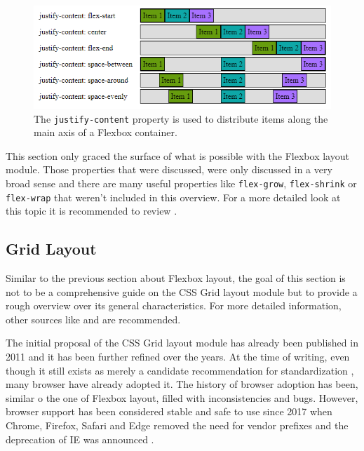\begin{figure}[tp]
    \centering
    \includegraphics[keepaspectratio,width=\linewidth,height=\fullh / 3]
    {images/flexbox-justify-content.png}

    \caption[Flexbox Justify Content Property]{
        The \lstinline{justify-content} property is used to distribute items along the main axis of a Flexbox container.
    }
    \label{fig:FlexboxJustifyContent}
\end{figure}

This section only graced the surface of what is possible with the Flexbox layout module. Those properties that were discussed, were only discussed in a very broad sense and there are many useful properties like \lstinline{flex-grow}, \lstinline{flex-shrink} or \lstinline{flex-wrap} that weren't included in this overview. For a more detailed look at this topic it is recommended to review \cite{CSSFlexbox}.

\subsection{Grid Layout}

Similar to the previous section about Flexbox layout, the goal of this section is not to be a comprehensive guide on the CSS Grid layout module but to provide a rough overview over its general characteristics. For more detailed information, other sources like \cite{GridLayoutInCSS} and \cite{CSSGrid} are recommended.

The initial proposal of the CSS Grid layout module has already been published in 2011 \parencite{CSSGridFirstDraft} and it has been further refined over the years. At the time of writing, even though it still exists as merely a candidate recommendation for standardization \parencite{CSSGrid}, many browser have already adopted it. The history of browser adoption has been, similar o the one of Flexbox layout, filled with inconsistencies and bugs. However, browser support has been considered stable and safe to use since 2017 when Chrome, Firefox, Safari and Edge removed the need for vendor prefixes and the deprecation of IE was announced \parencite{CanIUseCSSGrid}.

